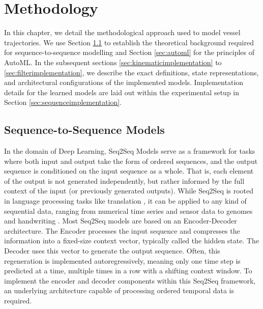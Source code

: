 \chapter{Methodology}
\label{chap:methology}
\acresetall %

 
In this chapter, we detail the methodological approach used to model vessel trajectories. We use Section \ref{sec:seq2seq} to establish the theoretical background required for sequence-to-sequence modelling and Section \ref{sec:automl} for the principles of \ac{AutoML}. In the subsequent sections \ref{sec:kinematicimplementation} to \ref{sec:filterimplementation}, we describe the exact definitions, state representations, and architectural configurations of the implemented models. Implementation details for the learned models are laid out within the experimental setup in Section \ref{sec:sequenceimplementation}.

\section{Sequence-to-Sequence Models}
\label{sec:seq2seq}

In the domain of Deep Learning, \acf{Seq2Seq}  Models serve as a framework for tasks where both input and output take the form of ordered sequences, and the output sequence is conditioned on the input sequence as a whole. That is, each element of the output is not generated independently, but rather informed by the full context of the input (or previously generated outputs).
While \ac{Seq2Seq} is rooted in language processing tasks like translation \parencite{sutskever2014sequencesequencelearningneural}, it can be %
applied to any kind of sequential data, ranging from numerical time series and sensor data to genomes and handwriting \parencite{gentleschmidt2019recurrentneuralnetworksrnns}. 
Most \ac{Seq2Seq} models are based on an Encoder-Decoder architecture. 
The Encoder processes the input sequence and compresses the information into a fixed-size context vector, typically called the hidden state.
The Decoder uses this vector to generate the output sequence.
Often, this regeneration is implemented autoregressively, meaning only one time step is predicted at a time, multiple times in a row with a shifting context window.
To implement the encoder and decoder components within this \ac{Seq2Seq} framework, an underlying architecture capable of processing ordered temporal data is required. %


